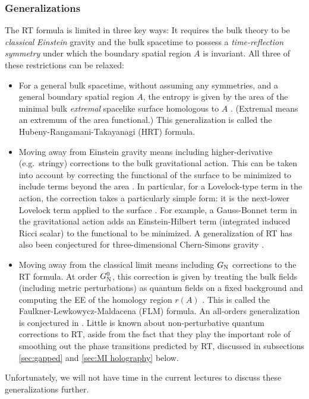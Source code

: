 \documentclass[11pt]{article}
\newcommand{\GN}{G_{\rm N}}
\begin{document}
\subsubsection{Generalizations}
\label{sec:generalizations}

The RT formula is limited in three key ways: It requires the bulk theory to be \emph{classical} \emph{Einstein} gravity and the bulk spacetime to possess a \emph{time-reflection symmetry} under which the boundary spatial region $A$ is invariant. All three of these restrictions can be relaxed:
\begin{itemize}
\item For a general bulk spacetime, without assuming any symmetries, and a general boundary spatial region $A$, the entropy is given by the area of the minimal bulk \emph{extremal} spacelike surface homologous to $A$ \cite{Hubeny:2007xt}. (Extremal means an extremum of the area functional.) This generalization is called the Hubeny-Rangamani-Takayanagi (HRT) formula.
\item Moving away from Einstein gravity means including higher-derivative (e.g.\ stringy) corrections to the bulk gravitational action. This can be taken into account by correcting the functional of the surface to be minimized to include terms beyond the area \cite{Dong:2013qoa}. In particular, for a Lovelock-type term in the action, the correction takes a particularly simple form: it is the next-lower Lovelock term applied to the surface \cite{deBoer:2011wk,Hung:2011xb}. For example, a Gauss-Bonnet term in the gravitational action adds an Einstein-Hilbert term (integrated induced Ricci scalar) to the functional to be minimized. A generalization of RT has also been conjectured for three-dimensional Chern-Simons gravity \cite{deBoer:2013vca}.
\item Moving away from the classical limit means including $\GN$ corrections to the RT formula. At order $\GN^0$, this correction is given by treating the bulk fields (including metric perturbations) as quantum fields on a fixed background and computing the EE of the homology region $r(A)$ \cite{Faulkner:2013ana}. This is called the Faulkner-Lewkowycz-Maldacena (FLM) formula. An all-orders generalization is conjectured in \cite{Engelhardt:2014gca}. Little is known about non-perturbative quantum corrections to RT, aside from the fact that they play the important role of smoothing out the phase transitions predicted by RT, discussed in subsections \ref{sec:gapped} and \ref{sec:MI holography} below. 
\end{itemize}
Unfortunately, we will not have time in the current lectures to discuss these generalizations further.
\end{document}
